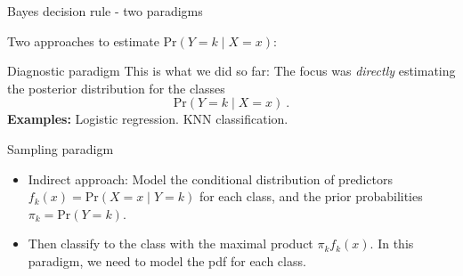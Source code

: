 \documentclass[
  10pt,
  ignorenonframetext,
]{beamer}
\providecommand{\tightlist}{%
  \setlength{\itemsep}{0pt}\setlength{\parskip}{0pt}}
\begin{document}
\begin{frame}{Bayes decision rule - two paradigms}
\protect\hypertarget{bayes-decision-rule---two-paradigms}{}
\vspace{1mm}

Two approaches to estimate \(\text{Pr}(Y=k \mid X=x)\): \vspace{1mm}

\begin{block}{Diagnostic paradigm}
\protect\hypertarget{diagnostic-paradigm}{}
This is what we did so far: The focus was \emph{directly} estimating the
posterior distribution for the classes \[\text{Pr}(Y=k \mid X=x)\ .\]
\textbf{Examples:} Logistic regression. KNN classification.

\vspace{2mm}
\end{block}

\begin{block}{Sampling paradigm}
\protect\hypertarget{sampling-paradigm}{}
\vspace{1mm}

\begin{itemize}
\tightlist
\item
  Indirect approach: Model the conditional distribution of predictors
  \(f_k(x)=\text{Pr}(X=x \mid Y=k)\) for each class, and the prior
  probabilities \(\pi_k=\text{Pr}(Y=k)\).
\end{itemize}

\vspace{1mm}

\begin{itemize}
\tightlist
\item
  Then classify to the class with the maximal product \(\pi_k f_k(x)\).
  In this paradigm, we need to model the pdf for each class.
\end{itemize}
\end{block}
\end{frame}
\end{document}
